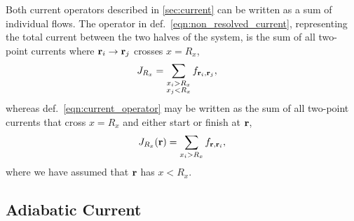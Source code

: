 Both current operators described in \textsection\ref{sec:current} can be written as a sum of individual flows. The operator in def.~\ref{eqn:non_resolved_current}, representing the total current between the two halves of the system, is the sum of all two-point currents where $\textbf r_i \rightarrow \textbf r_j$ crosses $x = R_x$,
\begin{align}
    J_{R_x} &= \sum_{\substack{x_i > R_x \\ x_j < R_x} } f_{\textbf r_i,\textbf r_j},
\end{align}
whereas def.~\ref{eqn:current_operator} may be written as the sum of all two-point currents that cross $x = R_x$ and either start or finish at $\textbf r$,
\begin{align}
    J_{R_x}(\textbf r) = \sum_{x_i > R_x} f_{\textbf r, \textbf r_i},
\end{align}
where we have assumed that $\textbf r$ has $x<R_x$.

\subsection{Adiabatic Current}

